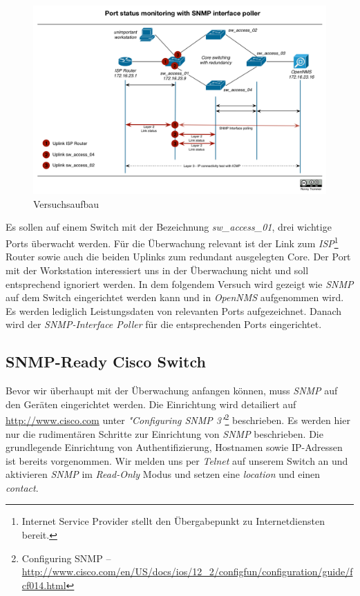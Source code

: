 \begin{figure}[H]
	\centering
	\includegraphics[width=1.0\textwidth]{images/use-cases/monitoring-layer-2/lab-plan}
	\caption{Versuchsaufbau}
	\label{pic:lab}
\end{figure}

Es sollen auf einem Switch mit der Bezeichnung \emph{sw\_access\_01}, drei wichtige Ports überwacht werden. Für die Überwachung relevant ist der Link zum \emph{ISP}\footnote{Internet Service Provider stellt den Übergabepunkt zu Internetdiensten bereit.} Router sowie auch die beiden Uplinks zum redundant ausgelegten Core. Der Port mit der Workstation interessiert uns in der Überwachung nicht und soll entsprechend ignoriert werden. In dem folgendem Versuch wird gezeigt wie \emph{SNMP} auf dem Switch eingerichtet werden kann und in \emph{OpenNMS} aufgenommen wird. Es werden lediglich Leistungsdaten von relevanten Ports aufgezeichnet. Danach wird der \emph{SNMP-Interface Poller} für die entsprechenden Ports eingerichtet.

\subsection{SNMP-Ready Cisco Switch}
Bevor wir überhaupt mit der Überwachung anfangen können, muss \emph{SNMP} auf den Geräten eingerichtet werden. Die Einrichtung wird detailiert auf \url{http://www.cisco.com} unter \emph{"Configuring SNMP 3"}\footnote{Configuring SNMP – \url{http://www.cisco.com/en/US/docs/ios/12_2/configfun/configuration/guide/fcf014.html}} beschrieben. Es werden hier nur die rudimentären Schritte zur Einrichtung von \emph{SNMP} beschrieben. Die grundlegende Einrichtung von Authentifizierung, Hostnamen sowie IP-Adressen ist bereits vorgenommen. Wir melden uns per \emph{Telnet} auf unserem Switch an und aktivieren \emph{SNMP} im \emph{Read-Only} Modus und setzen eine \emph{location} und einen \emph{contact}.

